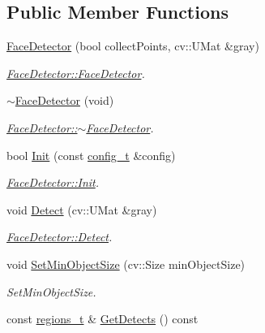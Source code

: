 \subsection*{Public Member Functions}
\begin{DoxyCompactItemize}
\item 
\mbox{\hyperlink{class_face_detector_a93e84050cdd04d877cc3a4f404f4ea9c}{Face\+Detector}} (bool collect\+Points, cv\+::\+U\+Mat \&gray)
\begin{DoxyCompactList}\small\item\em \mbox{\hyperlink{class_face_detector_a93e84050cdd04d877cc3a4f404f4ea9c}{Face\+Detector\+::\+Face\+Detector}}. \end{DoxyCompactList}\item 
\mbox{\hyperlink{class_face_detector_abcbd928d55d190c5a9f574c755ac01a6}{$\sim$\+Face\+Detector}} (void)
\begin{DoxyCompactList}\small\item\em \mbox{\hyperlink{class_face_detector_abcbd928d55d190c5a9f574c755ac01a6}{Face\+Detector\+::$\sim$\+Face\+Detector}}. \end{DoxyCompactList}\item 
bool \mbox{\hyperlink{class_face_detector_ad235988d85ae9c826269e21d5c3c1451}{Init}} (const \mbox{\hyperlink{defines_8h_a81d657237a541d02f8eeefdd40191920}{config\+\_\+t}} \&config)
\begin{DoxyCompactList}\small\item\em \mbox{\hyperlink{class_face_detector_ad235988d85ae9c826269e21d5c3c1451}{Face\+Detector\+::\+Init}}. \end{DoxyCompactList}\item 
void \mbox{\hyperlink{class_face_detector_a4b9210a00283d5bf394c6188e3e0ab39}{Detect}} (cv\+::\+U\+Mat \&gray)
\begin{DoxyCompactList}\small\item\em \mbox{\hyperlink{class_face_detector_a4b9210a00283d5bf394c6188e3e0ab39}{Face\+Detector\+::\+Detect}}. \end{DoxyCompactList}\item 
void \mbox{\hyperlink{class_base_detector_ab459f4e77cf1110cc1ee84027f0f2a03}{Set\+Min\+Object\+Size}} (cv\+::\+Size min\+Object\+Size)
\begin{DoxyCompactList}\small\item\em Set\+Min\+Object\+Size. \end{DoxyCompactList}\item 
const \mbox{\hyperlink{defines_8h_a01db0de56a20f4342820a093c5154536}{regions\+\_\+t}} \& \mbox{\hyperlink{class_base_detector_a52ac4b2feed15a47de84a69eb45c233f}{Get\+Detects}} () const

\end{DoxyCompactItemize}
